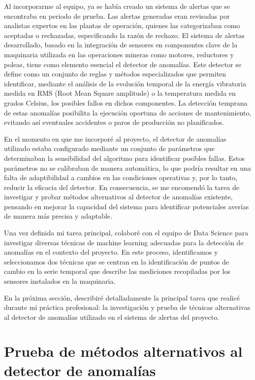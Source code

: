 \documentclass{article}[14pts]
\begin{document}
  Al incorporarme al equipo, ya se había creado un sistema de alertas que se encontraba en periodo de prueba. Las alertas generadas eran revisadas por analistas expertos en las plantas de operación, quienes las categorizaban como aceptadas o rechazadas, especificando la razón de rechazo. El sistema de alertas desarrollado, basado en la integración de sensores en componentes clave de la maquinaria 
  utilizada en las operaciones mineras como motores, reductores y poleas, tiene como elemento esencial el detector de anomalías. Este detector se define como un conjunto de reglas y métodos especializados que permiten identificar, mediante el análisis de la evolución temporal de la energía vibratoria medida en RMS (Root Mean Square amplitude) o la temperatura medida en grados Celsius, los posibles fallos en dichos componentes. La detección temprana de estas anomalías posibilita la ejecución oportuna de acciones de mantenimiento, evitando así eventuales accidentes o paros de producción no planificados.

  En el momento en que me incorporé al proyecto, el detector de anomalías utilizado estaba configurado mediante un conjunto de parámetros que determinaban la sensibilidad del algoritmo para identificar posibles fallas. Estos parámetros no se calibraban de manera automática, lo que podría resultar en una falta de adaptibilidad a cambios en las condiciones operativas y, por lo tanto, reducir la eficacia del detector. En consecuencia, se me encomendó la tarea de investigar y probar métodos alternativos al detector de anomalías existente, pensando en mejorar la capacidad del sistema para identificar potenciales averías de manera más precisa y adaptable.  

  Una vez definida mi tarea principal, colaboré con el equipo de Data Science para investigar diversas técnicas de machine learning adecuadas para la detección de anomalías en el contexto del proyecto. En este proceso, identificamos y seleccionamos dos técnicas que se centran en la identificación de puntos de cambio en la serie temporal que describe las mediciones recopiladas por los sensores instalados en la maquinaria. 

  En la próxima sección, describiré detalladamente la principal tarea que realicé durante mi práctica profesional: 
  la investigación y prueba de técnicas alternativas al detector de anomalías utilizado en el sistema de alertas del proyecto.

\section{Prueba de métodos alternativos al detector de anomalías}
\end{document}
